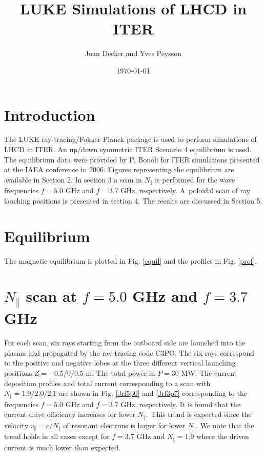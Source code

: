 \documentclass[a4paper,12pt]{article}%
\begin{document}
\title{LUKE Simulations of LHCD in ITER}
\author{Joan Decker and Yves Peysson}
\date{\today}
\maketitle

\section{Introduction}

The LUKE ray-tracing/Fokker-Planck package is used to perform simulations of
LHCD in ITER. An up/down symmetric ITER Scenario 4 equilibrium is used. The
equilibrium data were provided by P. Bonoli for ITER simulations presented at
the IAEA conference in 2006. Figures representing the equilibrium are
available in Section 2. In section 3 a scan in $N_{\Vert}$ is performed for
the wave frequencies $f=5.0$ GHz and $f=3.7$ GHz, respectively. A\ poloidal
scan of ray lauching positions is presented in section 4. The results are
discussed in Section 5.

\section{Equilibrium}

The magnetic equilibrium is plotted in Fig. \ref{equil} and the profiles in
Fig. \ref{prof}.

\section{$N_{\Vert}$ scan at $f=5.0$ GHz and $f=3.7$ GHz}

For each scan, six rays starting from the outboard side are launched into the
plasma and propagated by the ray-tracing code C3PO. The six rays correspond to
the positive and negative lobes at the three different vertical launching
positions $Z=-0.5/0/0.5$ m. The total power in $P=30$ MW. The current
deposition profiles and total current corresponding to a scan with $N_{\Vert
}=1.9/2.0/2.1$ are shown in Fig. \ref{Jrf5p0} and \ref{Jrf3p7} corresponding
to the frequencies $f=5.0$ GHz and $f=3.7$ GHz, respectively. It is found that
the current drive efficiency increases for lower $N_{\Vert}$.\ This trend is
expected since the velocity $v_{\Vert}=c/N_{\Vert}$ of resonant electrons is
larger for lower $N_{\Vert}$. We note that the trend holds in all cases except
for $f=3.7$ GHz and $N_{\Vert}=1.9$ where the driven current is much lower
than expected.
\end{document}
